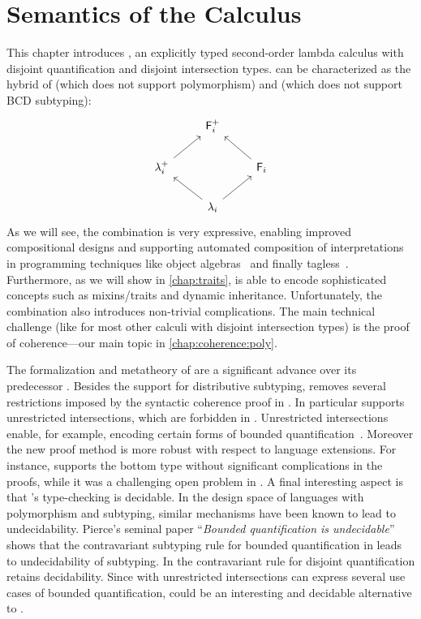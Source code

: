 
\chapter{Semantics of the \fnamee Calculus}
\label{chap:fi}

This chapter introduces \fnamee, an explicitly typed second-order lambda
calculus with disjoint quantification and disjoint intersection types. \fnamee
can be characterized as the hybrid of \namee (which does not support
polymorphism) and \fname (which does not support BCD subtyping):
\[
\begin{tikzcd}
 & \mathsf{F}_{i}^{+} &  \\
\lambda_{i}^{+} \arrow[ru] &  & \mathsf{F}_{i} \arrow[lu] \\
 & \lambda_{i} \arrow[lu] \arrow[ru] &
\end{tikzcd}
\]
As we will see, the combination is very expressive,
enabling improved compositional designs and supporting automated composition of
interpretations in programming techniques like object
algebras~\citep{oliveira2012extensibility} and finally
tagless~\citep{CARETTE_2009}. Furthermore, as we will show in
\cref{chap:traits}, \fnamee is able to encode sophisticated concepts such as
mixins/traits and dynamic inheritance. Unfortunately, the combination also
introduces non-trivial complications. The main technical challenge (like for
most other calculi with disjoint intersection types) is the proof of
coherence---our main topic in \cref{chap:coherence:poly}.


The formalization and metatheory of \fnamee are a significant advance over its
predecessor \fname. Besides the support for distributive subtyping, \fnamee
removes several restrictions imposed by the syntactic coherence proof in \fname.
In particular \fnamee supports unrestricted intersections, which are forbidden
in \fname. Unrestricted intersections enable, for example, encoding certain
forms of bounded quantification~\citep{pierce1991programming}. Moreover the new
proof method is more robust with respect to language extensions. For instance,
\fnamee supports the bottom type without significant complications in the
proofs, while it was a challenging open problem in \fname. A final interesting
aspect is that \fnamee's type-checking is decidable. In the design space of
languages with polymorphism and subtyping, similar mechanisms have been known to
lead to undecidability. Pierce's seminal paper ``\emph{Bounded quantification is
  undecidable}''~\citep{pierce1994bounded} shows that the contravariant subtyping
rule for bounded quantification in \fsub leads to undecidability of subtyping.
In \fnamee the contravariant rule for disjoint quantification retains
decidability. Since with unrestricted intersections \fnamee can express several
use cases of bounded quantification, \fnamee could be an interesting and
decidable alternative to \fsub.









